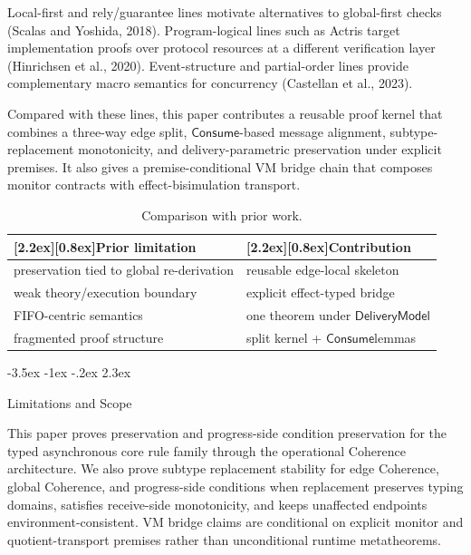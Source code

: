 \documentclass[a4paper,10pt,twocolumn,english]{article}
\makeatletter
\renewcommand{\section}{\@startsection{section}{1}{\z@}%
  {-3.5ex \@plus -1ex \@minus -.2ex}%
  {2.3ex}%
  {\raggedright\normalfont\large\bfseries}}
\numberwithin{equation}{section}
\theoremstyle{paperdef}
\theoremstyle{paperplain}
\theoremstyle{paperdef}
\theoremstyle{paperremark}
\newcommand{\thead}[1]{\textbf{\raisebox{0pt}[2.2ex][0.8ex]{#1}}}
\newcommand{\Consume}{\ensuremath{\mathsf{Consume}}}
\newcommand{\DeliveryModel}{\ensuremath{\mathsf{DeliveryModel}}}
\makeatother
\begin{document}
Local-first and rely/guarantee lines motivate alternatives to global-first checks (Scalas and Yoshida, 2018). Program-logical lines such as Actris target implementation proofs over protocol resources at a different verification layer (Hinrichsen et al., 2020). Event-structure and partial-order lines provide complementary macro semantics for concurrency (Castellan et al., 2023).

Compared with these lines, this paper contributes a reusable proof kernel that combines a three-way edge split, \Consume{}-based message alignment, subtype-replacement monotonicity, and delivery-parametric preservation under explicit premises. It also gives a premise-conditional VM bridge chain that composes monitor contracts with effect-bisimulation transport.

\begin{table}[H]
	\centering
	\small
	\begin{tabularx}{\columnwidth}{@{}L{0.47\columnwidth}L{0.48\columnwidth}@{}}
		\toprule
		\thead{Prior limitation}                  & \thead{Contribution}             \\
		\midrule
		preservation tied to global re-derivation & reusable edge-local skeleton     \\
		weak theory/execution boundary            & explicit effect-typed bridge     \\
		FIFO-centric semantics                    & one theorem under \DeliveryModel \\
		fragmented proof structure                & split kernel + \Consume lemmas   \\
		\bottomrule
	\end{tabularx}
	\caption{Comparison with prior work.}
\end{table}

\section{Limitations and Scope}
\label{sec:limitations}

This paper proves preservation and progress-side condition preservation for the typed asynchronous core rule family through the
operational Coherence architecture. We also prove subtype replacement stability for edge Coherence,
global Coherence, and progress-side conditions when replacement preserves typing domains, satisfies
receive-side monotonicity, and keeps unaffected endpoints environment-consistent. VM bridge claims are
conditional on explicit monitor and quotient-transport premises rather than unconditional runtime
metatheorems.
\end{document}

